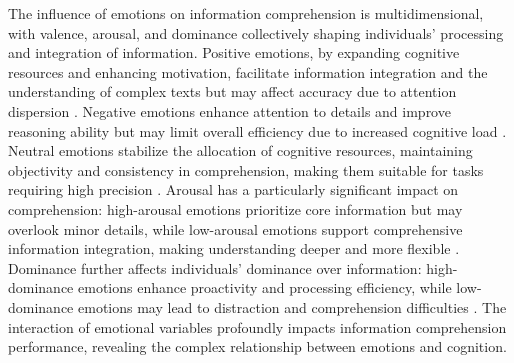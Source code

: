 The influence of emotions on information comprehension is multidimensional, with valence, arousal, and dominance collectively shaping individuals’ processing and integration of information. Positive emotions, by expanding cognitive resources and enhancing motivation, facilitate information integration and the understanding of complex texts but may affect accuracy due to attention dispersion \cite{egidi2012emotional}. Negative emotions enhance attention to details and improve reasoning ability but may limit overall efficiency due to increased cognitive load \cite{lang2007cognition}. Neutral emotions stabilize the allocation of cognitive resources, maintaining objectivity and consistency in comprehension, making them suitable for tasks requiring high precision \cite{earles2016memory}. Arousal has a particularly significant impact on comprehension: high-arousal emotions prioritize core information but may overlook minor details, while low-arousal emotions support comprehensive information integration, making understanding deeper and more flexible \cite{mather2011arousal}. Dominance further affects individuals’ dominance over information: high-dominance emotions enhance proactivity and processing efficiency, while low-dominance emotions may lead to distraction and comprehension difficulties \cite{mehrabian1996pleasure}. The interaction of emotional variables profoundly impacts information comprehension performance, revealing the complex relationship between emotions and cognition.



